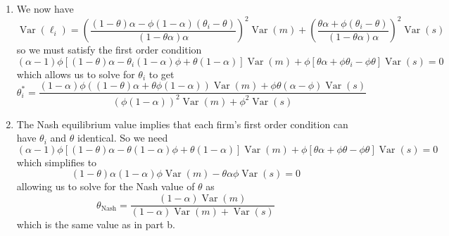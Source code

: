 \documentclass[11pt]{amsart}
\begin{document}
\begin{enumerate}[label = (\alph*)]
\begin{enumerate}[label = (\roman*)]
		\item We now have
		\[
		\operatorname{Var}(\ell_i) = \left(\frac{(1-\theta) \alpha - \phi (1-\alpha) (\theta_i - \theta)}{(1-\theta \alpha) \alpha}\right)^2 \operatorname{Var}(m) + \left(\frac{\theta \alpha + \phi (\theta_i - \theta)}{(1-\theta \alpha) \alpha}\right)^2 \operatorname{Var}(s)
		\]
		so we must satisfy the first order condition
		\[
		(\alpha - 1) \phi [(1-\theta) \alpha - \theta_i (1-\alpha) \phi + \theta (1-\alpha)] \operatorname{Var}(m) + \phi[\theta \alpha + \phi \theta_i - \phi \theta] \operatorname{Var}(s) = 0
		\]
		which allows us to solve for $\theta_i$ to get
		\[
		\theta_i^* = \frac{(1-\alpha) \phi ((1-\theta)\alpha + \theta \phi (1-\alpha)) \operatorname{Var}(m) + \phi \theta(\alpha - \phi) \operatorname{Var}(s)}{(\phi(1-\alpha))^2 \operatorname{Var}(m) + \phi^2 \operatorname{Var}(s)}
		\]
		
		\item The Nash equilibrium value implies that each firm's first order condition can have $\theta_i$ and $\theta$ identical. So we need 
		\[
		(\alpha - 1) \phi [(1-\theta) \alpha - \theta (1-\alpha) \phi + \theta (1-\alpha)] \operatorname{Var}(m) + \phi[\theta \alpha + \phi \theta - \phi \theta] \operatorname{Var}(s) = 0
		\]
		which simplifies to 
		\[
		(1-\theta) \alpha (1 - \alpha) \phi \operatorname{Var}(m) - \theta \alpha \phi \operatorname{Var}(s) = 0
		\]
		allowing us to solve for the Nash value of $\theta$ as
		\[
		\theta_{\text{Nash}} = \frac{(1-\alpha) \operatorname{Var}(m)}{(1-\alpha) \operatorname{Var}(m) + \operatorname{Var}(s)}
		\]
		which is the same value as in part b.
	\end{enumerate}
\end{enumerate}
\end{document}

